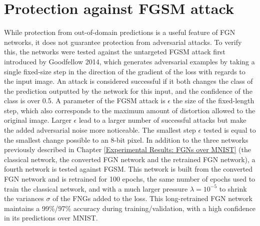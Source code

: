 \documentclass[12pt,oneside]{CUNY_PhD}
\begin{document}
\section{Protection against FGSM attack}
While protection from out-of-domain predictions is a useful feature of FGN networks, it does not guarantee protection from adversarial attacks. To verify this, the networks were tested against the untargeted FGSM attack first introduced by Goodfellow 2014\cite{goodfellow2015explaining}, which generates adversarial examples by taking a single fixed-size step in the direction of the gradient of the loss with regards to the input image. An attack is considered successful if it both changes the class of the prediction outputted by the network for this input, and the confidence of the class is over 0.5. A parameter of the FGSM attack is $\epsilon$ the size of the fixed-length step, which also corresponds to the maximum amount of distortion allowed to the original image. Larger $\epsilon$ lead to a larger number of successful attacks but make the added adversarial noise more noticeable. The smallest step $\epsilon$ tested is equal to the smallest change possible to an 8-bit pixel. In addition to the three networks previously described in Chapter \ref{Experimental Results: FGNs over MNIST} (the classical network, the converted FGN network and the retrained FGN network), a fourth network is tested against FGSM. This network is built from the converted FGN network and is retrained for 100 epochs, the same number of epochs used to train the classical network, and with a much larger pressure $\lambda=10^{-5}$ to shrink the variances $\sigma$ of the FNGs added to the loss. This long-retrained FGN network maintains a 99\%/97\% accuracy during training/validation, with a high confidence in its predictions over MNIST.
\end{document}
